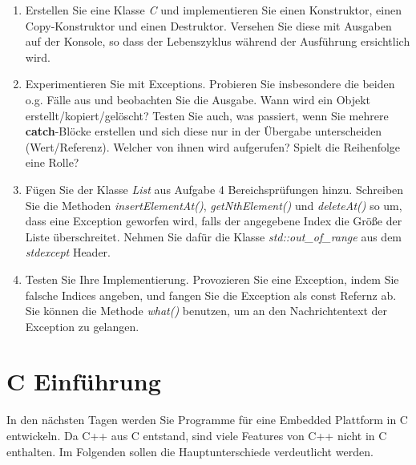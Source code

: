 \documentclass[
  accentcolor=tud1c,	%
  colorbacktitle,		%
  inverttitle,			%
  german,				%
  twoside
]{tudexercise}
\begin{document}
\begin{enumerate}
\item Erstellen Sie eine Klasse \emph{C} und implementieren Sie einen Konstruktor, einen Copy-Konstruktor und einen Destruktor. Versehen Sie diese mit Ausgaben auf der Konsole, so dass der Lebenszyklus während der Ausführung ersichtlich wird.

\item Experimentieren Sie mit Exceptions. Probieren Sie insbesondere die beiden o.g. Fälle aus und beobachten Sie die Ausgabe. Wann wird ein Objekt erstellt/kopiert/gelöscht? Testen Sie auch, was passiert, wenn Sie mehrere \textbf{catch}-Blöcke erstellen und sich diese nur in der Übergabe unterscheiden (Wert/Referenz). Welcher von ihnen wird aufgerufen? Spielt die Reihenfolge eine Rolle?

\item Fügen Sie der Klasse \emph{List} aus Aufgabe 4 Bereichsprüfungen hinzu. Schreiben Sie die Methoden \emph{insertElementAt()}, \emph{getNthElement()} und \emph{deleteAt()} so um, dass eine Exception geworfen wird, falls der angegebene Index die Größe der Liste überschreitet. Nehmen Sie dafür die Klasse \emph{std::out\_of\_range} aus dem \emph{stdexcept} Header.

\item Testen Sie Ihre Implementierung. Provozieren Sie eine Exception, indem Sie falsche Indices angeben, und fangen Sie die Exception als const Refernz ab. Sie können die Methode \emph{what()} benutzen, um an den Nachrichtentext der Exception zu gelangen.

\end{enumerate}

\section{C Einführung}
In den nächsten Tagen werden Sie Programme für eine Embedded Plattform in C entwickeln. Da C++ aus C entstand, sind viele Features von C++ nicht in C enthalten. Im Folgenden sollen die Hauptunterschiede verdeutlicht werden.
\end{document}
